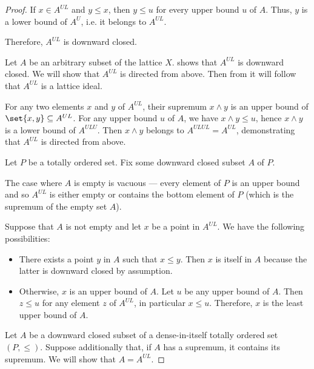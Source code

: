 \begin{proof}
   If \( x \in A^{UL} \) and \( y \leq x \), then \( y \leq u \) for every upper bound \( u \) of \( A \). Thus, \( y \) is a lower bound of \( A^U \), i.e. it belongs to \( A^{UL} \).

  Therefore, \( A^{UL} \) is downward closed.

   Let \( A \) be an arbitrary subset of the lattice \( X \).  shows that \( A^{UL} \) is downward closed. We will show that \( A^{UL} \) is directed from above. Then from  it will follow that \( A^{UL} \) is a lattice ideal.

  For any two elements \( x \) and \( y \) of \( A^{UL} \), their supremum \( x \wedge y \) is an upper bound of \( \set{ x, y } \subseteq A^{UL} \). For any upper bound \( u \) of \( A \), we have \( x \wedge y \leq u \), hence \( x \wedge y \) is a lower bound of \( A^{ULU} \). Then \( x \wedge y \) belongs to \( A^{ULUL} = A^{UL} \), demonstrating that \( A^{UL} \) is directed from above.

   Let \( P \) be a totally ordered set. Fix some downward closed subset \( A \) of \( P \).

  The case where \( A \) is empty is vacuous --- every element of \( P \) is an upper bound and so \( A^{UL} \) is either empty or contains the bottom element of \( P \) (which is the supremum of the empty set \( A \)).

  Suppose that \( A \) is not empty and let \( x \) be a point in \( A^{UL} \). We have the following possibilities:
  \begin{itemize}
    \item There exists a point \( y \) in \( A \) such that \( x \leq y \). Then \( x \) is itself in \( A \) because the latter is downward closed by assumption.
    \item Otherwise, \( x \) is an upper bound of \( A \). Let \( u \) be any upper bound of \( A \). Then \( z \leq u \) for any element \( z \) of \( A^{UL} \), in particular \( x \leq u \). Therefore, \( x \) is the least upper bound of \( A \).
  \end{itemize}

   Let \( A \) be a downward closed subset of a dense-in-itself totally ordered set \( (P, \leq) \). Suppose additionally that, if \( A \) has a supremum, it contains its supremum. We will show that \( A = A^{UL} \).


\end{proof}
